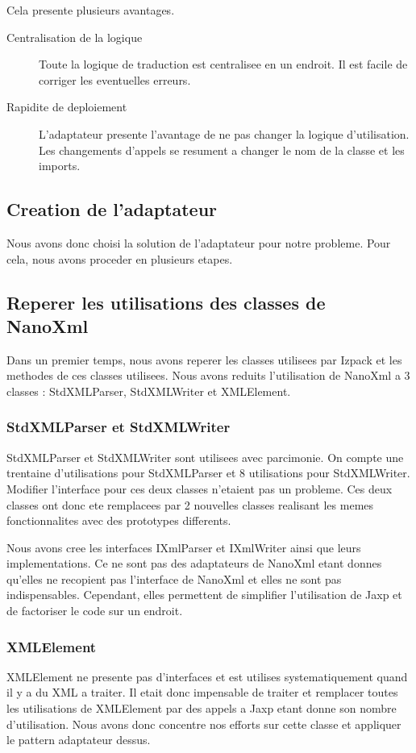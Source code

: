 Cela presente plusieurs avantages.
\begin{description}
\item[Centralisation de la logique] Toute la logique de traduction est centralisee en un endroit. Il est facile de corriger les eventuelles erreurs.
\item[Rapidite de deploiement] L'adaptateur presente l'avantage de ne pas changer la logique d'utilisation. Les changements d'appels se resument a changer le nom de la classe et les imports.
\end{description}
\subsection{Creation de l'adaptateur}
Nous avons donc choisi la solution de l'adaptateur pour notre probleme. Pour cela, nous avons proceder en plusieurs etapes.
\subsection{Reperer les utilisations des classes de NanoXml}
Dans un premier temps, nous avons reperer les classes utilisees par Izpack et les methodes de ces classes utilisees. Nous avons reduits l'utilisation de NanoXml a 3 classes : StdXMLParser, StdXMLWriter et XMLElement.
\subsubsection{StdXMLParser et StdXMLWriter}
StdXMLParser et StdXMLWriter sont utilisees avec parcimonie. On compte une trentaine d'utilisations pour StdXMLParser et 8 utilisations pour StdXMLWriter. Modifier l'interface pour ces deux classes n'etaient pas un probleme. Ces deux classes ont donc ete remplacees par 2 nouvelles classes realisant les memes fonctionnalites avec des prototypes differents.

Nous avons cree les interfaces IXmlParser et IXmlWriter ainsi que leurs implementations. Ce ne sont pas des adaptateurs de NanoXml etant donnes qu'elles ne recopient pas l'interface de NanoXml et elles ne sont pas indispensables. Cependant, elles permettent de simplifier l'utilisation de Jaxp et de factoriser le code sur un endroit.
\subsubsection{XMLElement}
XMLElement ne presente pas d'interfaces et est utilises systematiquement quand il y a du XML a traiter. Il etait donc impensable de traiter et remplacer toutes les utilisations de XMLElement par des appels a Jaxp etant donne son nombre d'utilisation. Nous avons donc concentre nos efforts sur cette classe et appliquer le pattern adaptateur dessus.

